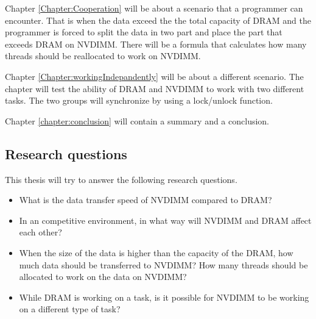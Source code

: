 \documentclass[12pt,a4paper,USenglish]{article}      %
\begin{document}

Chapter \ref{Chapter:Cooperation} will be about a scenario that a programmer can encounter. That is when the data exceed the the total capacity of DRAM and the programmer is forced to split the data in two part and place the part that exceeds DRAM on NVDIMM. There will be a formula that calculates how many threads should be reallocated to work on NVDIMM.

Chapter \ref{Chapter:workingIndepandently} will be about a different scenario. The chapter will test the ability of DRAM and NVDIMM to work with two different tasks. The two groups will synchronize by using a lock/unlock function. 


Chapter \ref{chapter:conclusion} will contain a summary and a conclusion.

\subsection{Research questions}
This thesis will try to answer the following research questions.
\begin{itemize}
\item What is the data transfer speed of NVDIMM compared to DRAM?
\item In an competitive environment, in what way will NVDIMM and DRAM affect each other?
\item When the size of the data is higher than the capacity of the DRAM, how much data should be transferred to NVDIMM? How many threads should be allocated to work on the data on NVDIMM?
\item While DRAM is working on a task, is it possible for NVDIMM to be working on a different type of task?
\end{itemize}

\end{document}
